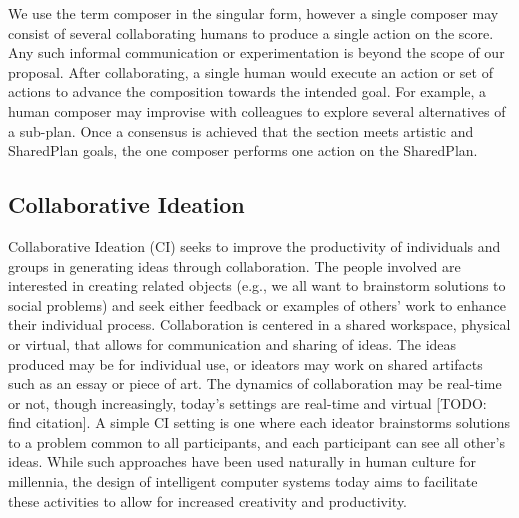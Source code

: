 \documentclass[final,authoryear,5p,times,twocolumn]{elsarticle}
\begin{document}
We use the term composer in the singular form, however a single composer may consist of several collaborating humans to produce a single action on the score. Any such informal communication or experimentation is beyond the scope of our proposal. After collaborating, a single human would execute an action or set of actions to advance the composition towards the intended goal. For example, a human composer may improvise with colleagues to explore several alternatives of a sub-plan. Once a consensus is achieved that the section meets artistic and SharedPlan goals, the one composer performs one action on the SharedPlan. 


\subsection{Collaborative Ideation}
Collaborative Ideation (CI) seeks to improve the productivity of individuals and groups in generating ideas through collaboration. The people involved are interested in creating related objects (e.g., we all want to brainstorm solutions to social problems) and seek either feedback or examples of others' work to enhance their individual process. Collaboration is centered in a shared workspace, physical or virtual, that allows for communication and sharing of ideas. The ideas produced may be for individual use, or ideators may work on shared artifacts such as an essay or piece of art. The dynamics of collaboration may be real-time or not, though increasingly, today's settings are real-time and virtual [TODO: find citation]. A simple CI setting is one where each ideator brainstorms solutions to a problem common to all participants, and each participant can see all other's ideas. While such approaches have been used naturally in human culture for millennia, the design of intelligent computer systems today aims to facilitate these activities to allow for increased creativity and productivity. 
\end{document}
